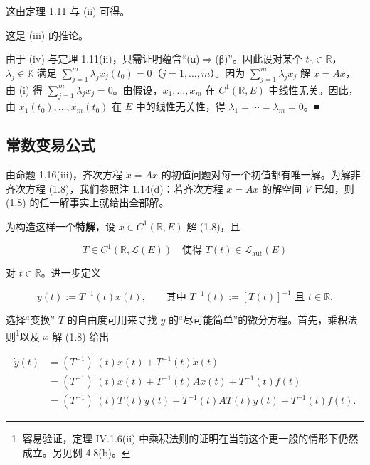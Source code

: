 \begin{proposition}
\begin{subitems}
\item[（iii）]

这由定理 1.11 与 (ii) 可得。

\item[（iv）]

这是 (iii) 的推论。

\item[（v）]

由于 (iv) 与定理 1.11(ii)，只需证明蕴含“(α)$ \Longrightarrow $(β)”。因此设对某个 $ t_{0} \in \mathbb{R} $，$ \lambda_{j} \in \mathbb{K} $ 满足 $ \sum_{j=1}^{m} \lambda_{j}x_{j}(t_{0}) = 0 $（$ j = 1, \ldots, m $）。因为 $ \sum_{j=1}^{m} \lambda_{j}x_{j} $ 解 $ \dot{x} = Ax $，由 (i) 得 $ \sum_{j=1}^{m} \lambda_{j}x_{j} = 0 $。由假设，$ x_{1}, \ldots, x_{m} $ 在 $ C^{1}(\mathbb{R}, E) $ 中线性无关。因此，由 $ x_{1}(t_{0}), \ldots, x_{m}(t_{0}) $ 在 $ E $ 中的线性无关性，得 $ \lambda_{1} = \cdots = \lambda_{m} = 0 $。\nobreak\hspace{0.35em}■

\end{subitems}

\end{proposition}

\subsection*{常数变易公式}

由命题 1.16(iii)，齐次方程 $ \dot{x} = Ax $ 的初值问题对每一个初值都有唯一解。为解非齐次方程 (1.8)，我们参照注 1.14(d)：若齐次方程 $ \dot{x} = Ax $ 的解空间 $ V $ 已知，则 (1.8) 的任一解事实上就给出全部解。

为构造这样一个\textbf{特解}，设 $ x \in C^{1}(\mathbb{R}, E) $ 解 (1.8)，且

\begin{equation}
T \in C^{1}(\mathbb{R}, \mathcal{L}(E)) \quad \text{使得 } T(t) \in \mathcal{L}_{\mathrm{aut}}(E)\tag{1.11}
\end{equation}

对 $ t \in \mathbb{R} $。进一步定义

\[
y(t) := T^{-1}(t)x(t) , \qquad \text{其中 } T^{-1}(t) := [T(t)]^{-1} \text{ 且 } t \in \mathbb{R} .
\]

选择“变换” $ T $ 的自由度可用来寻找 $ y $ 的“尽可能简单”的微分方程。首先，乘积法则\footnote{容易验证，定理 IV.1.6(ii) 中乘积法则的证明在当前这个更一般的情形下仍然成立。另见例 4.8(b)。}以及 $ x $ 解 (1.8) 给出

\begin{equation}
\begin{aligned}
\dot{y}(t) &= (T^{-1})^{\cdot}(t)x(t) + T^{-1}(t)\dot{x}(t) \\ &= (T^{-1})^{\cdot}(t)x(t) + T^{-1}(t)Ax(t) + T^{-1}(t)f(t) \\ &= (T^{-1})^{\cdot}(t)T(t)y(t) + T^{-1}(t)AT(t)y(t) + T^{-1}(t)f(t) .
\end{aligned}\tag{1.12}
\end{equation}

